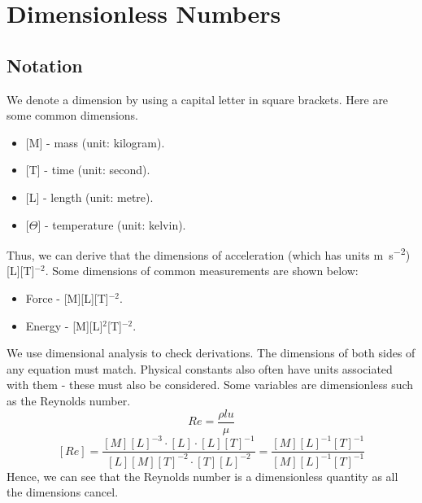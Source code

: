 \documentclass[class=report, crop=false, 12pt,a4paper]{standalone}
\begin{document}
\section{Dimensionless Numbers}
\subsection{Notation}
We denote a dimension by using a capital letter in square brackets. Here are some common dimensions.
\begin{itemize}[noitemsep]
  \item {[M]} - mass (unit: kilogram).
  \item {[T]} - time (unit: second).
  \item {[L]} - length (unit: metre).
  \item {[\(\Theta\)]} - temperature (unit: kelvin).
\end{itemize}
Thus, we can derive that the dimensions of acceleration (which has units \si{\meter\per\second\squared}) [L][T]\(^{-2}\). Some dimensions of common measurements are shown below:
\begin{itemize}[noitemsep]
  \item Force - [M][L][T]\(^{-2}\).
  \item Energy - [M][L]\(^2\)[T]\(^{-2}\).
\end{itemize}
We use dimensional analysis to check derivations. The dimensions of both sides of any equation must match. Physical constants also often have units associated with them - these must also be considered. Some variables are dimensionless such as the Reynolds number.
\[ Re = \frac{\rho l u}{\mu}\]
\[ [Re] = \frac{[M][L]^{-3}\cdot [L] \cdot [L][T]^{-1}}{[L][M][T]^{-2}\cdot [T][L]^{-2}} = \frac{[M][L]^{-1}[T]^{-1}}{[M][L]^{-1}[T]^{-1}} \] 
Hence, we can see that the Reynolds number is a dimensionless quantity as all the dimensions cancel.
\end{document}
